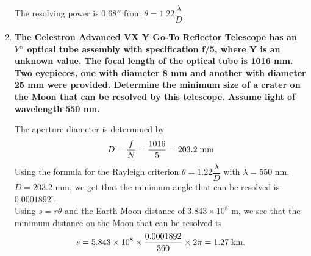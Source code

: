 \documentclass[a4paper,12pt]{extarticle}
\begin{document}
\begin{enumerate}
\begin{sol}
The resolving power is $0.68''$ from $\theta =1.22\dfrac{\lambda}{D}$. \end{sol}

\item \textbf{The Celestron Advanced VX Y Go-To Reflector Telescope has an $Y''$ optical tube assembly with specification f/5, where Y is an unknown value. The focal length of the optical tube is 1016 mm. Two eyepieces, one with diameter 8 mm and another with diameter 25 mm were provided. Determine the minimum size of a crater on the Moon that can be resolved by this telescope. Assume light of wavelength 550 nm.}

\begin{sol}
The aperture diameter is determined by
\[D=\frac{f}{N}=\frac{1016}{5}= 203.2 \; \rm mm\]
Using the formula for the Rayleigh criterion $\theta =1.22\dfrac{\lambda}{D}$ with $\lambda= 550$ nm, $D = 203.2$ mm, we get that the minimum angle that can be resolved is $0.0001892^\circ$.\\

Using $s = r\theta$ and the Earth-Moon distance of $3.843\times 10^8$ m, we see that the minimum distance on the Moon that can be resolved is
\[s=5.843\times 10^8 \times  \frac{0.0001892}{360}\times 2\pi =1.27\; \rm km.\]
\end{sol}


\end{enumerate}
\end{document}

